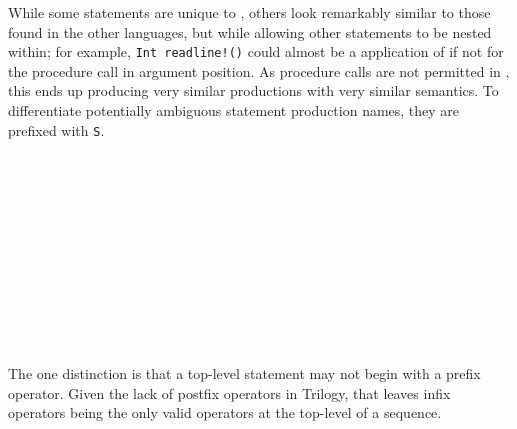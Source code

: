While some statements are unique to \Prose{}, others look remarkably similar
to those found in the other languages, but while allowing other statements
to be nested within; for example, \texttt{Int readline!()} could almost be
a \Poetry{} application of  if not for the procedure call in argument
position. As procedure calls are not permitted in \Poetry{}, this ends up
producing very similar productions with very similar semantics. To
differentiate potentially ambiguous statement production names, they
are prefixed with \texttt{S}.

\begin{bnf*}
     \\
     \\
     \\
     \\
     \\
     \\
     \\
     \\
     \\
     \\
\end{bnf*}

The one distinction is that a top-level statement may not begin with a
prefix operator. Given the lack of postfix operators in Trilogy, that
leaves infix operators being the only valid operators at the top-level
of a sequence.

